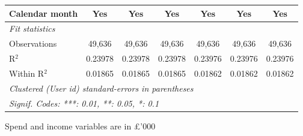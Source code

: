 \begin{table}[htbp]
\begin{threeparttable}[b]
\begin{tabular}{lcccccc}
         Calendar month          & Yes           & Yes           & Yes           & Yes           & Yes           & Yes\\  
         \midrule
         \emph{Fit statistics}\\
         Observations            & 49,636        & 49,636        & 49,636        & 49,636        & 49,636        & 49,636\\  
         R$^2$                   & 0.23978       & 0.23978       & 0.23978       & 0.23976       & 0.23976       & 0.23976\\  
         Within R$^2$            & 0.01865       & 0.01865       & 0.01865       & 0.01862       & 0.01862       & 0.01862\\  
         \midrule \midrule
         \multicolumn{7}{l}{\emph{Clustered (User id) standard-errors in parentheses}}\\
         \multicolumn{7}{l}{\emph{Signif. Codes: ***: 0.01, **: 0.05, *: 0.1}}\\
      \end{tabular}
      
      \begin{tablenotes}\footnotesize
         \item Spend and income variables are in £'000
      \end{tablenotes}
   \end{threeparttable}
\end{table}


